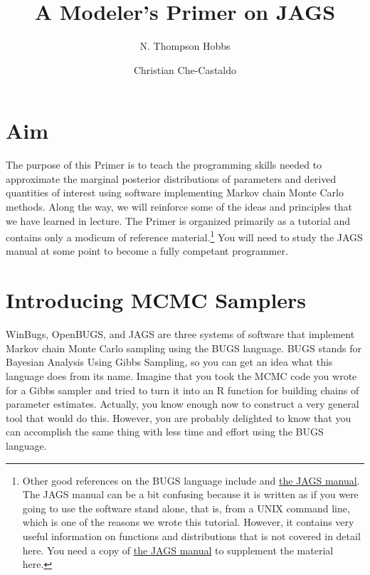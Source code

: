 \documentclass[12pt,english]{article}
\begin{document}
\title{A Modeler's Primer on JAGS}

\author[1]{N. Thompson Hobbs}
\author[2]{Christian Che-Castaldo}


\maketitle

\newpage

\tableofcontents{}
\listofalgorithms
\listofexercises

\newpage

\section{Aim}

The purpose of this Primer is to teach the programming skills needed to approximate the marginal posterior distributions of parameters and derived quantities of interest using software implementing Markov chain Monte Carlo methods. Along the way, we will reinforce some of the ideas and principles that we have learned in lecture. The Primer is organized primarily as a tutorial and contains only a modicum of reference material.\footnote{Other good references on the BUGS language include \citet{McCarthy_Bayes_book} and \href{https://sourceforge.net/projects/mcmc-jags/files/Manuals/4.x/}{the JAGS manual}. The JAGS manual can be a bit confusing because it is written as if you were going to use the software stand alone, that is, from a UNIX command line, which is one of the reasons we wrote this tutorial. However, it contains very useful information on functions and distributions that is not covered in detail here. You need a copy of \href{https://sourceforge.net/projects/mcmc-jags/files/Manuals/4.x/}{the JAGS manual} to supplement the material here.}  You will need to study the JAGS manual at some point to become a fully competant programmer. 

\section{Introducing MCMC Samplers}

WinBugs, OpenBUGS, and JAGS are three systems of software that implement Markov chain Monte Carlo sampling using the BUGS language. BUGS stands for Bayesian Analysis Using Gibbs Sampling, so you can get an idea what this language does from its name. Imagine that you took the MCMC code you wrote for a Gibbs sampler and tried to turn it into an R function for building chains of parameter estimates. Actually, you know enough now to construct a very general tool that would do this. However, you are probably delighted to know that you can accomplish the same thing with less time and effort using the BUGS language. 
\end{document}
